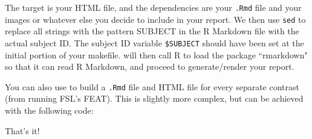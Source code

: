 The target is your HTML file, and the dependencies are your \texttt{.Rmd} file and your images or whatever else you decide to include in your report. We then use \texttt{sed} to replace all strings with the pattern SUBJECT in the R Markdown file with the actual subject ID. The subject ID variable \texttt{\$SUBJECT} should have been set at the initial portion of your makefile. \maken{} will then call R to load the package ``rmarkdown" so that it can read R Markdown, and proceed to generate/render your report.

You can also use \maken{} to build a \texttt{.Rmd} file and HTML file for every separate contrast (from running FSL's FEAT). This is slightly more complex, but can be achieved with the following code:

 

That's it! 













